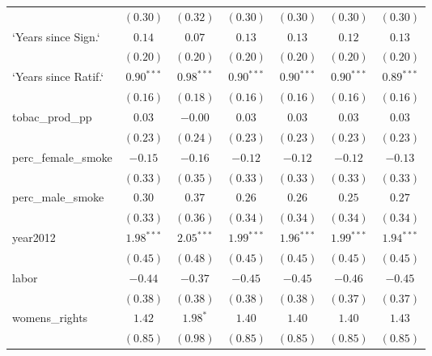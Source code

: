 \begin{table}[!h]
\begin{center}
\begin{tabular}{l c c c c c c }
                        & $(0.30)$     & $(0.32)$     & $(0.30)$     & $(0.30)$     & $(0.30)$     & $(0.30)$     \\
`Years since Sign.`     & $0.14$       & $0.07$       & $0.13$       & $0.13$       & $0.12$       & $0.13$       \\
                        & $(0.20)$     & $(0.20)$     & $(0.20)$     & $(0.20)$     & $(0.20)$     & $(0.20)$     \\
`Years since Ratif.`    & $0.90^{***}$ & $0.98^{***}$ & $0.90^{***}$ & $0.90^{***}$ & $0.90^{***}$ & $0.89^{***}$ \\
                        & $(0.16)$     & $(0.18)$     & $(0.16)$     & $(0.16)$     & $(0.16)$     & $(0.16)$     \\
tobac\_prod\_pp         & $0.03$       & $-0.00$      & $0.03$       & $0.03$       & $0.03$       & $0.03$       \\
                        & $(0.23)$     & $(0.24)$     & $(0.23)$     & $(0.23)$     & $(0.23)$     & $(0.23)$     \\
perc\_female\_smoke     & $-0.15$      & $-0.16$      & $-0.12$      & $-0.12$      & $-0.12$      & $-0.13$      \\
                        & $(0.33)$     & $(0.35)$     & $(0.33)$     & $(0.33)$     & $(0.33)$     & $(0.33)$     \\
perc\_male\_smoke       & $0.30$       & $0.37$       & $0.26$       & $0.26$       & $0.25$       & $0.27$       \\
                        & $(0.33)$     & $(0.36)$     & $(0.34)$     & $(0.34)$     & $(0.34)$     & $(0.34)$     \\
year2012                & $1.98^{***}$ & $2.05^{***}$ & $1.99^{***}$ & $1.96^{***}$ & $1.99^{***}$ & $1.94^{***}$ \\
                        & $(0.45)$     & $(0.48)$     & $(0.45)$     & $(0.45)$     & $(0.45)$     & $(0.45)$     \\
labor                   & $-0.44$      & $-0.37$      & $-0.45$      & $-0.45$      & $-0.46$      & $-0.45$      \\
                        & $(0.38)$     & $(0.38)$     & $(0.38)$     & $(0.38)$     & $(0.37)$     & $(0.37)$     \\
womens\_rights          & $1.42$       & $1.98^{*}$   & $1.40$       & $1.40$       & $1.40$       & $1.43$       \\
                        & $(0.85)$     & $(0.98)$     & $(0.85)$     & $(0.85)$     & $(0.85)$     & $(0.85)$     \\

\end{tabular}
\end{center}
\end{table}
